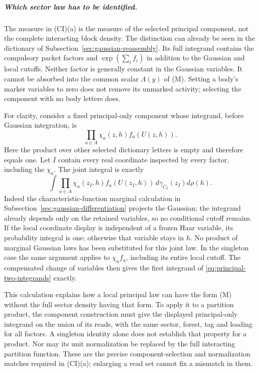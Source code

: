 \subparagraph{Which sector law has to be identified.}
The measure in (CI)(a) is the measure of the selected principal component,
not the complete interacting block density. The distinction can already
be seen in the dictionary of Subsection~\ref{sec:gaussian-reassembly}.
Its full integrand contains the compulsory packet factors and
$\exp(\sum_i f_i)$ in addition to the Gaussian and local cutoffs.
Neither factor is generally constant in the Gaussian variables.
It cannot be absorbed into the common scalar $\Lambda(y)$ of (M).
Setting a body's marker variables to zero does not remove its unmarked
activity; selecting the component with no body letters does.

For clarity, consider a fixed principal-only component whose integrand,
before Gaussian integration, is
\[
             \prod_{a\in A}\chi_a(z,h)f_a(U(z,h)).
\]
Here the product over other selected dictionary letters is empty and
therefore equals one. Let $I$ contain every real coordinate inspected
by every factor, including the $\chi_a$. The joint integral is exactly
\[
 \int\prod_{a\in A}\chi_a(z_I,h)f_a(U(z_I,h))
                  \,d\gamma_{C_I}(z_I)d\rho(h).
\]
Indeed the characteristic-function marginal calculation in
Subsection~\ref{sec:gaussian-differentiation} projects the Gaussian;
the integrand already depends only on the retained variables, so no
conditional cutoff remains. If the local coordinate display is
independent of a frozen Haar variable, its probability integral is one;
otherwise that variable stays in $h$. No product of marginal Gaussian
laws has been substituted for this joint law.
In the singleton case the same argument applies to
$\chi_a f_a$, including its entire local cutoff. The compensated
change of variables then gives the first integrand of
\eqref{eq:principal-two-integrands} exactly.

This calculation explains how a local principal law can have the form
(M) without the full sector density having that form. To apply it to a
partition product, the component construction must give the displayed
principal-only integrand on the union of its reads, with the same
sector, forest, tag and loading for all factors. A singleton identity
alone does not establish that property for a product. Nor may its unit
normalization be replaced by the full interacting partition function.
These are the precise component-selection and normalization matches
required in (CI)(a); enlarging a read set cannot fix a mismatch in them.

